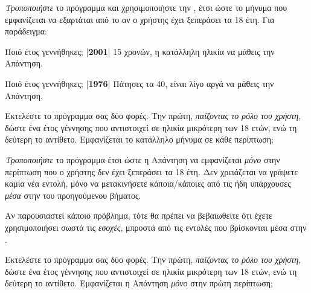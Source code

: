 \documentclass[a4paper,11pt,oneside]{book}
\begin{document}
\begin{step}
\emph{Τροποποιήστε} το πρόγραμμα και χρησιμοποιήστε την , έτσι ώστε το μήνυμα που εμφανίζεται να εξαρτάται από το αν ο χρήστης έχει ξεπεράσει τα 18 έτη. Για παράδειγμα:

\marginnote[24pt]{\iconcomputer\hspace{1ex}\iconkeyboard}
\begin{pyterm}
Ποιό έτος γεννήθηκες;
|\textbf{2001}|
15 χρονών, η κατάλληλη ηλικία να μάθεις την Απάντηση.
\end{pyterm}

\begin{pyterm}
Ποιό έτος γεννήθηκες;
|\textbf{1976}|
Πάτησες τα 40, είναι λίγο αργά να μάθεις την Απάντηση.
\end{pyterm}

Εκτελέστε το πρόγραμμα σας δύο φορές. Την πρώτη, \emph{παίζοντας το ρόλο του χρήστη}, δώστε ένα έτος γέννησης που αντιστοιχεί σε ηλικία μικρότερη των 18 ετών, ενώ τη δεύτερη το αντίθετο. Εμφανίζεται το κατάλληλο μήνυμα σε κάθε περίπτωση;

\marginnote[14pt]{\icondiscuss}
\dottedline
\end{step}

\begin{step}
\emph{Τροποποιήστε} το πρόγραμμα έτσι ώστε η Απάντηση να εμφανίζεται \emph{μόνο} στην περίπτωση που ο χρήστης δεν έχει ξεπεράσει τα 18 έτη. Δεν χρειάζεται να γράψετε καμία νέα εντολή, μόνο να μετακινήσετε κάποια/κάποιες από τις ήδη υπάρχουσες \emph{μέσα} στην  του προηγούμενου βήματος.

\marginnote[18pt]{\iconcaution}
\begin{note}
Αν παρουσιαστεί κάποιο πρόβλημα, τότε θα πρέπει να βεβαιωθείτε ότι έχετε χρησιμοποιήσει σωστά τις \emph{εσοχές}, μπροστά από τις εντολές που βρίσκονται μέσα στην .
\end{note}

Εκτελέστε το πρόγραμμα σας δύο φορές. Την πρώτη, \emph{παίζοντας το ρόλο του χρήστη}, δώστε ένα έτος γέννησης που αντιστοιχεί σε ηλικία μικρότερη των 18 ετών, ενώ τη δεύτερη το αντίθετο. Εμφανίζεται η Απάντηση \emph{μόνο} στην πρώτη περίπτωση;

\marginnote[14pt]{\icondiscuss}
\dottedline
\end{step}

\end{document}
